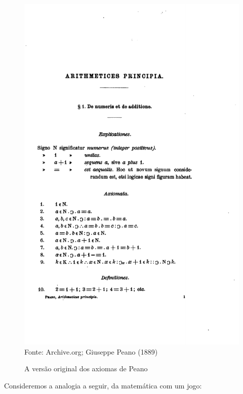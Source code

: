 \documentclass[../main.tex]{subfiles}
\begin{document}
\begin{figure}
    \begin{center}
        \caption{A versão original dos axiomas de Peano}\label{fig:axiomas-peano}
        \hbox{\includegraphics[scale=1]{../include/peano_axioms_original}}
        Fonte: Archive.org; Giuseppe Peano (1889)
    \end{center}  
\end{figure}
\newpage
Consideremos a analogia a seguir, da matemática com um jogo:
\end{document}
